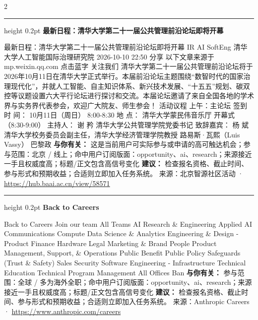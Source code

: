 \documentclass[10.5pt]{ctexart}
\begin{document}
\begin{multicols}{2}
\vspace{2mm}
\hrule height 0.2pt
\vspace{2mm}
{\large\bfseries 最新日程：清华大学第二十一届公共管理前沿论坛即将开幕}\par
最新日程：清华大学第二十一届公共管理前沿论坛即将开幕 IR AI SoftEng 清华大学人工智能国际治理研究院 2026-10-10 22:50 分享 以下文章来源于mp.weixin.qq.com 点击蓝字 关注我们 清华大学第二十一届公共管理前沿论坛将于2026年10月11日在清华大学正式举行。本届前沿论坛主题围绕“数智时代的国家治理现代化”，并就人工智能、自主知识体系、新兴技术发展、“十五五”规划、碳双控等议题设置六大平行论坛进行探讨和交流。本届论坛邀请了来自全国各地的学术界与实务界代表参会，欢迎广大院友、师生参会！ 活动议程 上午：主论坛 签到 时 间： 10月11日（周日） 8:00-8:30 地 点： 清华大学蒙民伟音乐厅 开幕式（8:30-9:00） 主持人： 谢 矜 清华大学公共管理学院党委书记 致辞嘉宾： 杨 斌 清华大学校务委员会副主任，清华大学经济管理学院教授 路易斯·瓦熙（Luis Vassy） 巴黎政
\textbf{与你有关：} 这是当前用户可实际参与或申请的高可触达机会；参与范围：北京 / 线上；命中用户订阅版面：opportunity、ai、research；来源接近一手且权威度高；标题/正文包含高信号变化
\textbf{建议：} 检查报名资格、截止时间、参与形式和预期收益；合适则立即加入任务系统。
{\footnotesize\color{ormuted} 来源：北京智源社区活动 · \url{https://hub.baai.ac.cn/view/58571}}
\vspace{2mm}
\hrule height 0.2pt
\vspace{2mm}
{\large\bfseries Back to Careers}\par
Back to Careers Join our team All Teams AI Research \& Engineering Applied AI Communications Compute Data Science \& Analytics Engineering \& Design - Product Finance Hardware Legal Marketing \& Brand People Product Management, Support, \& Operations Public Benefit Public Policy Safeguards (Trust \& Safety) Sales Security Software Engineering - Infrastructure Technical Education Technical Program Management All Offices Ban
\textbf{与你有关：} 参与范围：全球 / 多为海外全职；命中用户订阅版面：opportunity、ai、research；来源接近一手且权威度高；标题/正文包含高信号变化
\textbf{建议：} 检查报名资格、截止时间、参与形式和预期收益；合适则立即加入任务系统。
{\footnotesize\color{ormuted} 来源：Anthropic Careers · \url{https://www.anthropic.com/careers}}
\end{multicols}
\end{document}

